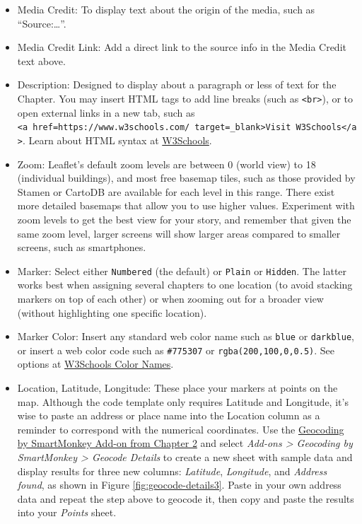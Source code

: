 \documentclass[
  english,
]{book}
\begin{document}
\begin{itemize}
\item
  Media Credit: To display text about the origin of the media, such as ``Source:\ldots{}''.
\item
  Media Credit Link: Add a direct link to the source info in the Media Credit text above.
\item
  Description: Designed to display about a paragraph or less of text for the Chapter. You may insert HTML tags to add line breaks (such as \texttt{\textless{}br\textgreater{}}), or to open external links in a new tab, such as \texttt{\textless{}a\ href=\textquotesingle{}https://www.w3schools.com/\textquotesingle{}\ target=\textquotesingle{}\_blank\textquotesingle{}\textgreater{}Visit\ W3Schools\textless{}/a\textgreater{}}. Learn about HTML syntax at \href{https://www.w3schools.com/html/html_links.asp}{W3Schools}.
\item
  Zoom: Leaflet's default zoom levels are between 0 (world view) to 18 (individual buildings), and most free basemap tiles, such as those provided by Stamen or CartoDB are available for each level in this range. There exist more detailed basemaps that allow you to use higher values. Experiment with zoom levels to get the best view for your story, and remember that given the same zoom level, larger screens will show larger areas compared to smaller screens, such as smartphones.
\item
  Marker: Select either \texttt{Numbered} (the default) or \texttt{Plain} or \texttt{Hidden}. The latter works best when assigning several chapters to one location (to avoid stacking markers on top of each other) or when zooming out for a broader view (without highlighting one specific location).
\item
  Marker Color: Insert any standard web color name such as \texttt{blue} or \texttt{darkblue}, or insert a web color code such as \texttt{\#775307} or \texttt{rgba(200,100,0,0.5)}. See options at \href{https://www.w3schools.com/colors/colors_names.asp}{W3Schools Color Names}.
\item
  Location, Latitude, Longitude: These place your markers at points on the map. Although the code template only requires Latitude and Longitude, it's wise to paste an address or place name into the Location column as a reminder to correspond with the numerical coordinates. Use the \href{geocode.html}{Geocoding by SmartMonkey Add-on from Chapter 2} and select \emph{Add-ons \textgreater{} Geocoding by SmartMonkey \textgreater{} Geocode Details} to create a new sheet with sample data and display results for three new columns: \emph{Latitude}, \emph{Longitude}, and \emph{Address found}, as shown in Figure \ref{fig:geocode-details3}. Paste in your own address data and repeat the step above to geocode it, then copy and paste the results into your \emph{Points} sheet.
\end{itemize}
\end{document}
